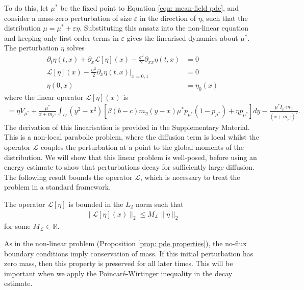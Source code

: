 \documentclass[10pt]{article}
\begin{document}
To do this, let $\mu^*$ be the fixed point to Equation \ref{eqn: mean-field pde}, and consider a mass-zero perturbation of size $\varepsilon$ in the direction of $\eta$, such that the distribution $\mu = \mu^* + \varepsilon \eta $. Substituting this ansatz into the non-linear equation and keeping only first order terms in $\varepsilon$ gives the linearised dynamics about $\mu^*$. The perturbation $\eta$ solves
\begin{subequations}\label{eqn: linear stability pde}
\begin{align}
    \partial_t \eta(t,x) + \partial_x \mathcal{L}[\eta](x)- \frac{\sigma^2}{2}\partial_{xx}\eta(t,x) &= 0\\
    \mathcal{L}[\eta](x) -\frac{\sigma^2}{2}\partial_x\eta(t,x)\bigg|_{x=0,1} &= 0\\
    \eta(0,x) &= \eta_0(x)
\end{align}
\end{subequations}
where the linear operator $\mathcal{L}[\eta](x)$ is
{
\small
\begin{align}\label{eqn: operator L}
 =\eta V_{\mu^*} + \frac{\mu^*}{{x+m_{\mu^*}} }\int_\Omega(y^2-x^2)[\beta(b-c)m_\eta(y-x)\mu^*p_{\mu^*}(1-p_{\mu^*}) + \eta p_{\mu^*}]dy - \frac{\mu^*I_{\mu^*} m_\eta}{(x+m_{\mu^*})^2}.
\end{align}
}
The derivation of this linearisation is provided in the Supplementary Material. This is a non-local parabolic problem, where the diffusion term is local whilst the operator $\mathcal{L}$ couples the perturbation at a point to the global moments of the distribution. We will show that this linear problem is well-posed, before using an energy estimate to show that perturbations decay for sufficiently large diffusion. The following result bounds the operator $\mathcal{L}$, which is necessary to treat the problem in a standard framework.
\begin{proposition}\label{prop: linear stability, operator L is bounded}
    The operator $\mathcal{L}[\eta]$ is bounded in the $L_2$ norm such that 
    \begin{align*}
        \|\mathcal{L}[\eta](x)\|_2 \leq M_\mathcal{L}\|\eta\|_2
    \end{align*}
    for some $M_\mathcal{L} \in \mathbb{R}$.
\end{proposition}
As in the non-linear problem (Proposition \ref{prop: pde properties}), the no-flux boundary conditions imply conservation of mass. If this initial perturbation has zero mass, then this property is preserved for all later times. This will be important when we apply the Poincaré-Wirtinger inequality in the decay estimate.
\end{document}
